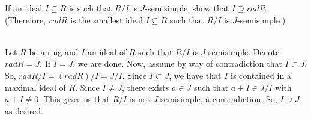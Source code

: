 If an ideal $I\subseteq R$ is such that $R/I$ is $J$-semisimple, show that $I\supseteq rad R$.
(Therefore, $rad R$ is the smallest ideal $I\subseteq R$ such that $R/I$ is $J$-semisimple.)\\

\begin{solution}\renewcommand{\qedsymbol}{}\ \\
    Let $R$ be a ring and $I$ an ideal of $R$ such that $R/I$ is $J$-semisimple. Denote $rad R=J$. If
    $I=J$, we are done. Now, assume by way of contradiction that $I\subset J$. So,
    $rad R/I=(rad R)/I=J/I$. Since $I\subset J$, we have that $I$ is contained in a maximal ideal of
    $R$. Since $I\neq J$, there exists $a\in J$ such that $a+I\in J/I$ with $a+I\neq0$. This gives us
    that $R/I$ is not $J$-semisimple, a contradiction. So, $I\supseteq J$ as desired.

\end{solution}